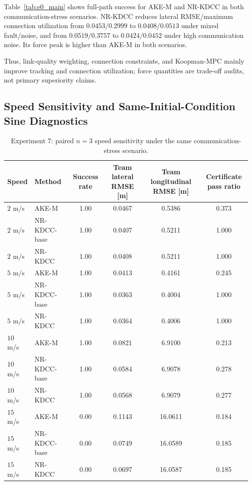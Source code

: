 \documentclass[letterpaper,journal]{IEEEtran}
\newcommand{\AKE}{AKE-M}
\newcommand{\Method}{NR-KDCC}
\newcommand{\MethodBase}{NR-KDCC-base}
\begin{document}
Table~\ref{tab:e0_main} shows full-path success for \AKE{} and \Method{} in both communication-stress scenarios. \Method{} reduces lateral RMSE/maximum connection utilization from $0.0453/0.2999$ to $0.0408/0.0513$ under mixed fault/noise, and from $0.0519/0.3757$ to $0.0424/0.0452$ under high communication noise. Its force peak is higher than \AKE{} in both scenarios.

Thus, link-quality weighting, connection constraints, and Koopman-MPC mainly improve tracking and connection utilization; force quantities are trade-off audits, not primary superiority claims.

\subsection{Speed Sensitivity and Same-Initial-Condition Sine Diagnostics}

\begin{table}[!t]
\centering
\caption{Experiment 7: paired $n=3$ speed sensitivity under the same communication-stress scenario.}
\label{tab:speed_sensitivity}
\footnotesize
\begin{tabular}{llcccc}
\toprule
Speed & Method & Success rate & Team lateral RMSE [m] & Team longitudinal RMSE [m] & Certificate pass ratio \\
\midrule
$2$ m/s & \AKE{} & 1.00 & 0.0467 & 0.5386 & 0.373\\
$2$ m/s & \MethodBase{} & 1.00 & 0.0407 & 0.5211 & 1.000\\
$2$ m/s & \Method{} & 1.00 & 0.0408 & 0.5211 & 1.000\\
$5$ m/s & \AKE{} & 1.00 & 0.0413 & 0.4161 & 0.245\\
$5$ m/s & \MethodBase{} & 1.00 & 0.0363 & 0.4004 & 1.000\\
$5$ m/s & \Method{} & 1.00 & 0.0364 & 0.4006 & 1.000\\
$10$ m/s & \AKE{} & 1.00 & 0.0821 & 6.9100 & 0.213\\
$10$ m/s & \MethodBase{} & 1.00 & 0.0584 & 6.9078 & 0.278\\
$10$ m/s & \Method{} & 1.00 & 0.0568 & 6.9079 & 0.277\\
$15$ m/s & \AKE{} & 0.00 & 0.1143 & 16.0611 & 0.184\\
$15$ m/s & \MethodBase{} & 0.00 & 0.0749 & 16.0589 & 0.185\\
$15$ m/s & \Method{} & 0.00 & 0.0697 & 16.0587 & 0.185\\
\bottomrule
\end{tabular}
\end{table}
\end{document}
